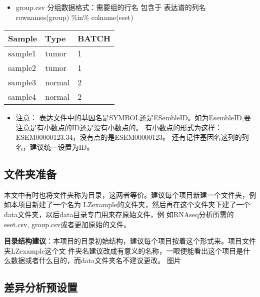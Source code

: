 \documentclass[
]{book}
\providecommand{\tightlist}{%
  \setlength{\itemsep}{0pt}\setlength{\parskip}{0pt}}
\begin{document}
\begin{itemize}
\tightlist
\item
  group.csv 分组数据格式：需要组的行名 包含于 表达谱的列名 rownames(group) \%in\% colname(eset)
\end{itemize}

\begin{longtable}[]{@{}lll@{}}
\toprule\noalign{}
Sample & Type & BATCH \\
\midrule\noalign{}
\endhead
\bottomrule\noalign{}
\endlastfoot
sample1 & tumor & 1 \\
sample2 & tumor & 1 \\
sample3 & normal & 2 \\
sample4 & normal & 2 \\
\end{longtable}

\begin{itemize}
\tightlist
\item
  注意：
  表达文件中的基因名是SYMBOL还是ESembleID。如为EsembleID,要注意是有小数点的ID还是没有小数点的。
  有小数点的形式为这样：ESEM00000123.34，没有点的是ESEM00000123。
  还有记住基因名这列的列名，建议统一设置为ID。
\end{itemize}

\subsection{文件夹准备}\label{ux6587ux4ef6ux5939ux51c6ux5907}

本文中有时也将文件夹称为目录，这两者等价。建议每个项目新建一个文件夹，例如本项目新建了一个名为
LZexample的文件夹，然后再在这个文件夹下建了一个data文件夹，以后data目录专门用来存原始文件，例
如RNAseq分析所需的eset.csv, group.csv或者更加原始的文件。

\textbf{目录结构建议}：本项目的目录初始结构，建议每个项目按着这个形式来。项目文件夹LZexample这个文
件夹名建议改成有意义的名称，一眼便能看出这个项目是什么数据或者什么目的，而data文件夹名不建议更改。
图片

\subsection{差异分析预设置}\label{ux5deeux5f02ux5206ux6790ux9884ux8bbeux7f6e}
\end{document}
